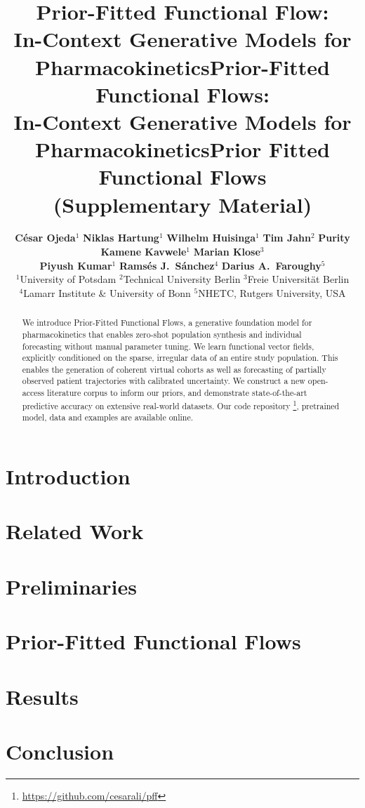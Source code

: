 \documentclass[accepted]{uai2026} %
\title{Prior-Fitted Functional Flow:\\ In-Context Generative Models for Pharmacokinetics}
\title{Prior-Fitted Functional Flows:\\
In-Context Generative Models for Pharmacokinetics}
\author{
\textbf{César Ojeda}$^{1}$ \quad
\textbf{Niklas Hartung}$^{1}$ \quad
\textbf{Wilhelm Huisinga}$^{1}$ \quad
\textbf{Tim Jahn}$^{2}$ \quad
\textbf{Purity Kamene Kavwele}$^{1}$ \quad
\textbf{Marian Klose}$^{3}$ \\
\textbf{Piyush Kumar}$^{1}$ \quad
\textbf{Rams\'es J.~S\'anchez}$^{4}$ \quad
\textbf{Darius A.~Faroughy}$^{5}$ \\
{\normalsize
$^{1}$University of Potsdam \quad
$^{2}$Technical University Berlin \quad
$^{3}$Freie Universit\"at Berlin \\
$^{4}$Lamarr Institute \& University of Bonn \quad
$^{5}$NHETC, Rutgers University, USA
}
}
\theoremstyle{plain}
\theoremstyle{definition}
\theoremstyle{remark}
\renewcommand{\*}[1]{{\bf #1}}
\begin{document}
\maketitle

\begin{abstract}
 We introduce Prior-Fitted Functional Flows, a generative foundation model for pharmacokinetics that enables zero-shot population synthesis and individual forecasting without manual parameter tuning. We learn functional vector fields, explicitly conditioned on the sparse, irregular data of an entire study population. This enables the generation of coherent virtual cohorts as well as forecasting of partially observed patient trajectories with calibrated uncertainty. We construct a new open-access literature corpus to inform our priors, and demonstrate state-of-the-art predictive accuracy on extensive real-world datasets. Our code repository \footnote{\url{https://github.com/cesarali/pff}}, pretrained model, data  and examples are available online.
\end{abstract}


\section{Introduction}
\label{sec:intro}


\section{Related Work}
\label{sec:related-work}


\section{Preliminaries}
\label{sec:preliminaries}


\section{Prior-Fitted Functional Flows}
\label{sec:model}


\section{Results}
\label{sec:results}


\section{Conclusion}
\label{sec:conclusion}




\newpage
\onecolumn

\title{Prior Fitted Functional Flows \\(Supplementary Material)}
\maketitle
\appendix


\end{document}
